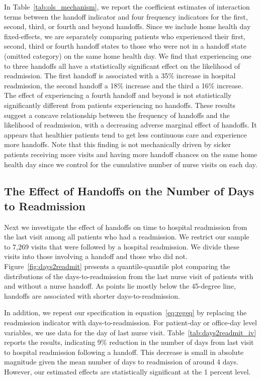 \documentclass[final,12pt, notitlepage]{article}
\begin{document}
In Table~\ref{tab:ols_mechanism}, we report the coefficient estimates of interaction terms between the handoff indicator and four frequency indicators for the first, second, third, or fourth and beyond handoffs.
Since we include home health day fixed-effects, we are separately comparing patients who experienced their first, second, third or fourth handoff states to those who were not in a handoff state (omitted category) on the same home health day.
We find that experiencing one to three handoffs all have a statistically significant effect on the likelihood of readmission. The first handoff is associated with a 35\% increase in hospital readmission, the second handoff a 18\% increase and the third a 16\% increase.
The effect of experiencing a fourth handoff and beyond is not statistically significantly different from patients experiencing no handoffs.
These results suggest a concave relationship between the frequency of handoffs and the likelihood of readmission, with a decreasing adverse marginal effect of handoffs. It appears that healthier patients tend to get less continuous care and experience more handoffs.
Note that this finding is not mechanically driven by sicker patients receiving more visits and having more handoff chances on the same home health day since we control for the cumulative number of nurse visits on each day.

\subsection{The Effect of Handoffs on the Number of Days to Readmission}

Next we investigate the effect of handoffs on time to hospital readmission from the last visit among all patients who had a readmission. We restrict our sample to 7,269 visits that were followed by a hospital readmission. We divide these visits into those involving a handoff and those who did not. Figure~\ref{fig:days2readmit} presents a quantile-quantile plot comparing the distributions of the days-to-readmission from the last nurse visit of patients with and without a nurse handoff. As points lie mostly below the 45-degree line, handoffs are associated with shorter days-to-readmission.

In addition, we repeat our specification in equation~\ref{eq:regeq} by replacing the readmission indicator with days-to-readmission.
For patient-day or office-day level variables, we use data for the day of last nurse visit. Table~\ref{tab:days2readmit_iv} reports the results, indicating 9\% reduction in the number of days from last visit to hospital readmission following a handoff. This decrease is small in absolute magnitude given the mean number of days to readmission of around 4 days. However, our estimated effects are statistically significant at the 1 percent level.
\end{document}
